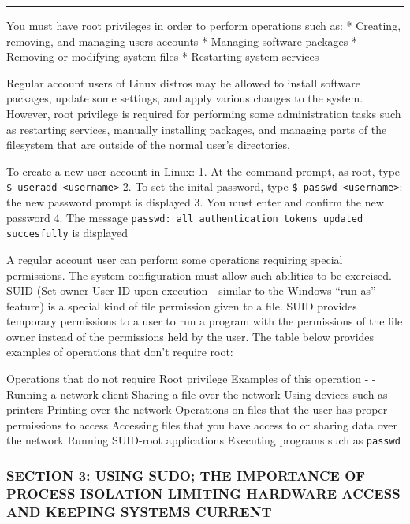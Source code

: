 \begin{center}\rule{3in}{0.4pt}\end{center}

You must have root privileges in order to perform operations such as: *
Creating, removing, and managing users accounts * Managing software
packages * Removing or modifying system files * Restarting system
services

Regular account users of Linux distros may be allowed to install
software packages, update some settings, and apply various changes to
the system. However, root privilege is required for performing some
administration tasks such as restarting services, manually installing
packages, and managing parts of the filesystem that are outside of the
normal user's directories.

To create a new user account in Linux: 1. At the command prompt, as
root, type \texttt{\$ useradd \textless{}username\textgreater{}} 2. To
set the inital password, type
\texttt{\$ passwd \textless{}username\textgreater{}}: the new password
prompt is displayed 3. You must enter and confirm the new password 4.
The message
\texttt{passwd: all authentication tokens updated succesfully} is
displayed

A regular account user can perform some operations requiring special
permissions. The system configuration must allow such abilities to be
exercised. SUID (Set owner User ID upon execution - similar to the
Windows ``run as'' feature) is a special kind of file permission given
to a file. SUID provides temporary permissions to a user to run a
program with the permissions of the file owner instead of the
permissions held by the user. The table below provides examples of
operations that don't require root:

Operations that do not require Root privilege \textbar{} Examples of
this operation - \textbar{} - Running a network client \textbar{}
Sharing a file over the network Using devices such as printers
\textbar{} Printing over the network Operations on files that the user
has proper permissions to access \textbar{} Accessing files that you
have access to or sharing data over the network Running SUID-root
applications \textbar{} Executing programs such as \texttt{passwd}

\subsubsection{SECTION 3: USING SUDO; THE IMPORTANCE OF PROCESS
ISOLATION LIMITING HARDWARE ACCESS AND KEEPING SYSTEMS
CURRENT}\label{section-3-using-sudo-the-importance-of-process-isolation-limiting-hardware-access-and-keeping-systems-current}


